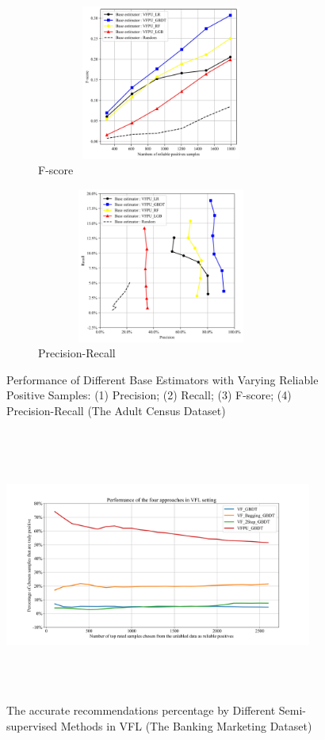 \documentclass[10pt,journal,compsoc]{IEEEtran}
\begin{document}
\begin{figure}[!htbp]
	\begin{subfigure}{0.45\textwidth}
		\centering
		\captionsetup{skip=2pt}
		\captionsetup{size=scriptsize}
		\includegraphics[width=0.9\textwidth,height=5.1cm]{./Figure 4 (3) in JEPG format}
		\caption{F-score}
		\label{RQ2.3.sub3}
	\end{subfigure}
	\begin{subfigure}{0.45\textwidth}
		\centering
		\captionsetup{skip=2pt}
		\captionsetup{size=scriptsize}
		\includegraphics[width=0.9\textwidth,height=5.1cm]{./Figure 4 (4) in JEPG format}
		\caption{Precision-Recall}
		\label{RQ2.3.sub4}
	\end{subfigure}
	
	\caption{Performance of Different Base Estimators with Varying Reliable Positive Samples: (1) Precision; (2) Recall; (3) F-score; (4) Precision-Recall (The Adult Census Dataset)}
	\label{RQ2.3}
\end{figure}

\begin{figure}[!htbp]
	\centering
	\captionsetup{size=footnotesize}
	\includegraphics[width=0.9\textwidth,height=9cm]{./Figure 5 in JPEG format}
	\caption{The accurate recommendations percentage by Different Semi-supervised Methods in VFL (The Banking Marketing Dataset)}
	\label{fig:GBDT}
\end{figure}
\end{document}
